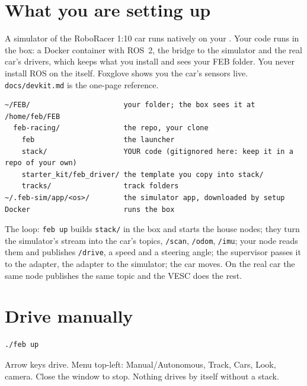 
\section*{What you are setting up}

A simulator of the RoboRacer 1:10 car runs natively on your \OSname. Your code runs in the box: a
Docker container with ROS~2, the bridge to the simulator and the real car's drivers, which keeps
what you install and sees your FEB folder. You never install ROS on the \OSname{} itself.
Foxglove shows you the car's sensors live. \texttt{docs/devkit.md} is the one-page reference.

\begin{lstlisting}
~/FEB/                      your folder; the box sees it at /home/feb/FEB
  feb-racing/               the repo, your clone
    feb                     the launcher
    stack/                  YOUR code (gitignored here: keep it in a repo of your own)
    starter_kit/feb_driver/ the template you copy into stack/
    tracks/                 track folders
~/.feb-sim/app/<os>/        the simulator app, downloaded by setup
Docker                      runs the box
\end{lstlisting}

The loop: \texttt{feb up} builds \texttt{stack/} in the box and starts the house nodes; they turn
the simulator's stream into the car's topics, \texttt{/scan}, \texttt{/odom}, \texttt{/imu}; your node
reads them and publishes \texttt{/drive}, a speed and a steering angle; the supervisor passes it to
the adapter, the adapter to the simulator; the car moves. On the real car the same node publishes
the same topic and the VESC does the rest.



\section{Drive manually}

\begin{lstlisting}
./feb up
\end{lstlisting}

Arrow keys drive. Menu top-left: Manual/Autonomous, Track, Cars, Look, camera. Close the
window to stop. Nothing drives by itself without a stack.

